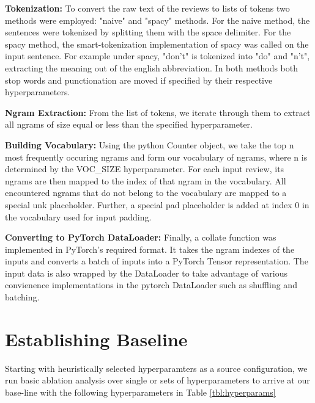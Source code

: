 \documentclass[a4paper,10pt]{article}
\begin{document}
\par
\justify
\textbf{Tokenization:} To convert the raw text of the reviews to lists of tokens two methods were employed: "naive" and "spacy" methods. For the naive method, the sentences were tokenized by splitting them with the space delimiter. For the spacy method, the smart-tokenization implementation of spacy was called on the input sentence. For example under spacy, "don't" is tokenized into "do" and "n't", extracting the meaning out of the english abbreviation. In both methods both stop words and punctionation are moved if specified by their respective hyperparameters.

\par
\justify
\textbf{Ngram Extraction:} From the list of tokens, we iterate through them to extract all ngrams of size equal or less than the specified hyperparameter. 

\par
\justify
\textbf{Building Vocabulary:} Using the python Counter object, we take the top n most frequently occuring ngrams and form our vocabulary of ngrams, where n is determined by the VOC\_SIZE hyperparameter. For each input review, its ngrams are then mapped to the index of that ngram in the vocabulary. All encountered ngrams that do not belong to the vocabulary are mapped to a special \textlangle{}unk\textrangle{} placeholder. Further, a special \textlangle{}pad\textrangle{} placeholder is added at index 0 in the vocabulary used for input padding.

\par
\justify
\textbf{Converting to PyTorch DataLoader:} Finally, a collate function was implemented in PyTorch's required format. It takes the ngram indexes of the inputs and converts a batch of inputs into a PyTorch Tensor representation. The input data is also wrapped by the DataLoader to take advantage of various convienence implementations in the pytorch DataLoader such as shuffling and batching.

\section{Establishing Baseline}
Starting with heuristically selected hyperparamters as a source configuration, we run basic ablation analysis over single or sets of hyperparameters to arrive at our base-line with the following hyperparameters in Table \ref{tbl:hyperparams}
\end{document}
